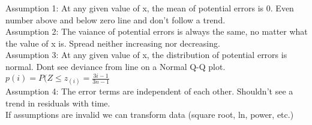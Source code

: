 \documentclass[letter, 12pt]{article}
\begin{document}
\begin{multicols}{2}
Assumption 1: At any given value of x, the mean of potential errors is 0. Even number above and below zero line and don't follow a trend.\\
Assumption 2: The vaiance of potential errors is always the same, no matter what the value of x is. Spread neither increasing nor decreasing.\\
Assumption 3: At any given value of x, the distribution of potential errors is normal. Dont see deviance from line on a Normal Q-Q plot.\\
\(p(i) = P(Z\leq z_{(i)} = \frac{3i-1}{3n-1}\)\\
Assumption 4: The error terms are independent of each other. Shouldn't see a trend in residuals with time.\\
If assumptions are invalid we can transform data (square root, ln, power, etc.)
\end{multicols}
\end{document}
